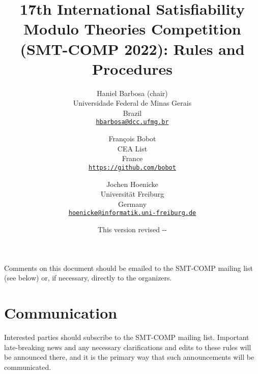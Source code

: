 \documentclass[12pt]{article}
\begin{document}
\date{\small This version revised \the\year-\the\month-\the\day}

\title{17th International Satisfiability Modulo Theories Competition
  (SMT-COMP 2022): Rules and Procedures}

\def\doauthor#1{{%
  \hsize.5\hsize \advance\hsize by-1cm %
  \def\\{\hss\egroup\hbox to\hsize\bgroup\strut\hss}%
  \vbox{\hbox to\hsize\bgroup\strut\hss#1\hss\egroup}}}%

\def\header#1{\medskip\noindent\textbf{#1}}

\author{%
Haniel Barbosa (chair)\\
Universidade Federal de Minas Gerais\\
Brazil\\
{\small\href{mailto:hbarbosa@dcc.ufmg.br}{\texttt{hbarbosa@dcc.ufmg.br}}}\\
\and
Fran\c{c}ois Bobot\\
CEA List \\
France \\
{\small\href{mailto:Francois.BOBOT@cea.fr}{\texttt{https://github.com/bobot}}} \\
\and
Jochen Hoenicke\\
Universit\"at Freiburg\\
Germany\\
{\small\href{mailto:hoenicke@informatik.uni-freiburg.de}{\texttt{hoenicke@informatik.uni-freiburg.de}}}
}

\maketitle

\noindent Comments on this document should be emailed to the SMT-COMP
mailing list (see below) or, if necessary, directly to the organizers.


\section{Communication}

Interested parties should subscribe to the SMT-COMP mailing list.
Important late-breaking news and any necessary clarifications and
edits to these rules will be announced there, and it is the primary
way that such announcements will be communicated.
\end{document}
